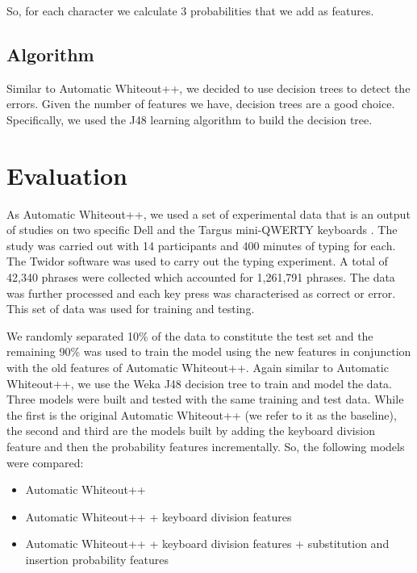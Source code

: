 \documentclass[letterpaper, 10 pt, conference]{ieeeconf}  %
\begin{document}
So, for each character we calculate 3 probabilities that we add as features.

\subsection{Algorithm}

Similar to Automatic Whiteout++, we decided to use decision trees to detect the errors. Given the number of features we have, decision trees are a good choice. Specifically, we used the J48 learning algorithm to build the decision tree.

\section{Evaluation}

As Automatic Whiteout++, we used a set of experimental data that is an output of studies on two specific Dell and the Targus mini-QWERTY keyboards \cite{clawson2006mobile}. The study was carried out with 14 participants and 400 minutes of typing for each. The Twidor software was used to carry out the typing experiment. A total of 42,340 phrases were collected which accounted for 1,261,791 phrases. The data was further processed and each key press was characterised as correct or error. This set of data was used for training and testing.

We randomly separated 10\% of the data to constitute the test set and the remaining 90\% was used to train the model using the new features in conjunction with the old features of Automatic Whiteout++. Again similar to Automatic Whiteout++, we use the Weka J48 decision tree to train and model the data. Three models were built and tested with the same training and test data. While the first is the original Automatic Whiteout++ (we refer to it as the baseline), the second and third are the models built by adding the keyboard division feature and then the probability features incrementally. So, the following models were compared:
\begin{itemize}
\item Automatic Whiteout++
\item Automatic Whiteout++ + keyboard division features
\item Automatic Whiteout++ + keyboard division features + substitution and insertion probability features
\end{itemize}
\end{document}
